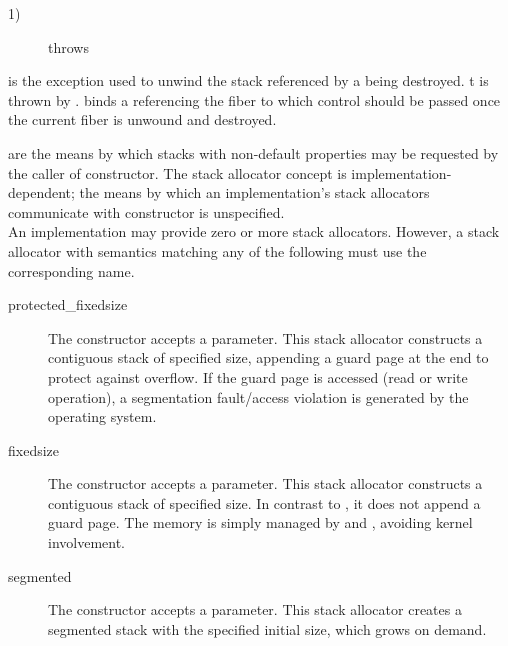 \begin{description}
    \item[1)] throws \unwindex
\end{description}



is the exception used to unwind the stack referenced by a \fiber being destroyed.
t is thrown by \unwindcont. \unwindex binds a \fiber referencing the fiber to
which control should be passed once the current fiber is unwound and destroyed.


\label{subsec:stackalloc}

are the means by which stacks with non-default properties may be requested by
the caller of \fiber constructor. The stack allocator concept is
implementation-dependent; the means by which an implementation's
stack allocators communicate with \fiber constructor is unspecified.\\

An implementation may provide zero or more stack allocators. However, a stack
allocator with semantics matching any of the following must use the
corresponding name.
\begin{description}
  \item[protected\_fixedsize] The constructor accepts a  parameter.
        This stack allocator constructs a contiguous stack of specified size,
        appending a guard page at the end to protect against overflow. If the
        guard page is accessed (read or write operation), a segmentation
        fault/access violation is generated by the operating system.
  \item[fixedsize] The constructor accepts a  parameter.
        This stack allocator constructs a contiguous stack of specified size.
        In contrast to , it does not append a guard
        page. The memory is simply managed by 
        and , avoiding kernel involvement.
  \item[segmented] The constructor accepts a  parameter.
        This stack allocator creates a segmented stack\cite{gccsplit} with the
        specified initial size, which grows on demand.
\end{description}
